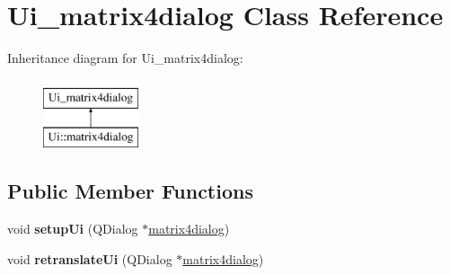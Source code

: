 \hypertarget{class_ui__matrix4dialog}{}\section{Ui\+\_\+matrix4dialog Class Reference}
\label{class_ui__matrix4dialog}
Inheritance diagram for Ui\+\_\+matrix4dialog\+:\begin{figure}[H]
\begin{center}
\leavevmode
\includegraphics[height=2.000000cm]{class_ui__matrix4dialog}
\end{center}
\end{figure}
\subsection*{Public Member Functions}
\begin{DoxyCompactItemize}
\item 
\mbox{\label{class_ui__matrix4dialog_aef219b6ca55919d404217da65f6d9f84}} 
void {\bfseries setup\+Ui} (Q\+Dialog $\ast$\mbox{\hyperlink{classmatrix4dialog}{matrix4dialog}})
\item 
\mbox{\label{class_ui__matrix4dialog_a0140e00a8003ec0682fad02b5422c32c}} 
void {\bfseries retranslate\+Ui} (Q\+Dialog $\ast$\mbox{\hyperlink{classmatrix4dialog}{matrix4dialog}})
\end{DoxyCompactItemize}
